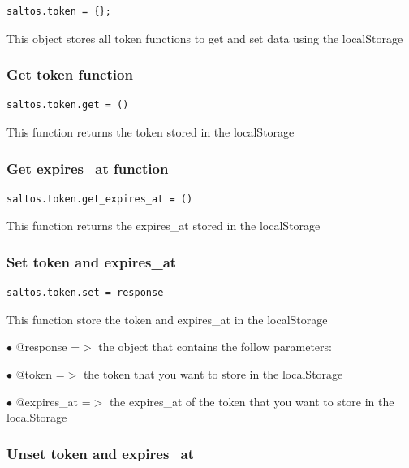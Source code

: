 \documentclass[a4paper]{article}
\begin{document}
\begin{lstlisting}
saltos.token = {};
\end{lstlisting}

This object stores all token functions to get and set data using the localStorage

\hypertarget{toc299}{}
\subsubsection{Get token function}

\begin{lstlisting}
saltos.token.get = ()
\end{lstlisting}

This function returns the token stored in the localStorage

\hypertarget{toc300}{}
\subsubsection{Get expires\_at function}

\begin{lstlisting}
saltos.token.get_expires_at = ()
\end{lstlisting}

This function returns the expires\_at stored in the localStorage

\hypertarget{toc301}{}
\subsubsection{Set token and expires\_at}

\begin{lstlisting}
saltos.token.set = response
\end{lstlisting}

This function store the token and expires\_at in the localStorage

\begin{compactitem}
\item[\color{myblue}$\bullet$] @response   =$>$ the object that contains the follow parameters:
\item[\color{myblue}$\bullet$] @token      =$>$ the token that you want to store in the localStorage
\item[\color{myblue}$\bullet$] @expires\_at =$>$ the expires\_at of the token that you want to store in the localStorage
\end{compactitem}

\hypertarget{toc302}{}
\subsubsection{Unset token and expires\_at}
\end{document}
